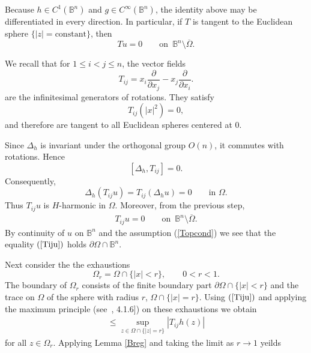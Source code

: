 \documentclass[12pt]{amsart}
\numberwithin{equation}{section}
\newcommand{\Bn}{\mathbb B^n}
\theoremstyle{plain}
\numberwithin{equation}{section}
\numberwithin{theorem}{section}
\numberwithin{proposition}{section}
\begin{document}
Because \(h\in C^1(\mathbb B^n)\) and \(g\in C^\infty(\Bn)\), the
identity above may be differentiated in every direction. In particular, if \(T\) is tangent to the Euclidean sphere
\(\{|z|=\mathrm{constant}\}\), then
\[
Tu=0
\qquad\text{on }\,\mathbb B^n\setminus\overline\Omega.
\]

We recall that for \(1\le i<j\le n\), the vector fields
\[
T_{ij}
=
x_i\frac{\partial}{\partial x_j}
-
x_j\frac{\partial}{\partial x_i}.
\]
are the infinitesimal generators of rotations. They satisfy
\[
T_{ij}(|x|^2)=0,
\]
and therefore are tangent to all Euclidean spheres centered at \(0\).

Since \(\Delta_h\) is invariant under the orthogonal group \(O(n)\), it
commutes with rotations. Hence
\[
[\Delta_h,T_{ij}]=0.
\]
Consequently,
\[
\Delta_h(T_{ij}u)
=
T_{ij}(\Delta_h u)
=
0
\qquad\text{in }\Omega.
\]
Thus \(T_{ij}u\) is \(H\)-harmonic in \(\Omega\).
Moreover, from the previous step,
\begin{eqnarray}\label{Tiju} 
T_{ij}u=0
\qquad\text{on }\,\mathbb B^n\setminus\overline\Omega.
\end{eqnarray}
By continuity of $u$ on $\mathbb B^n$ and  the assumption (\ref{Topcond}) we see that  the equality $(\ref{Tiju} )$ holds $\partial \Omega \cap \mathbb B^n.$  

Next consider the the
exhaustions
\[
\Omega_r=\Omega\cap\{|x|<r\},
\qquad 0<r<1.
\]
The boundary of \(\Omega_r\) consists of the finite boundary part
\(\partial\Omega\cap\{|x|<r\}\) and the  trace on $\Omega$ of the sphere with radius $r$,
\(\Omega\cap\{|x|=r\}\). 
Using $(\ref{Tiju} )$ and applying  the maximum principle (see~\cite{St}, 4.1.6]) on these
exhaustions we obtain
\begin{eqnarray*}
[T_{ij}u(z)] \leq 
\sup_{z\in\Omega\cap\{|z|=r\}}
|T_{ij}h(z)|
\end{eqnarray*}
 for all $z \in \Omega_r.$ Applying  Lemma \ref{Breg} and  taking the limit as $r\to 1$ yeilds
\end{document}
